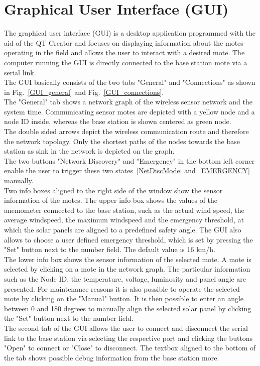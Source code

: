 \documentclass[conference]{IEEEtran}
\begin{document}
\section{Graphical User Interface (GUI)} \label{GUI}
The graphical user interface (GUI) is a desktop application programmed with the aid of the QT Creator and focuses on displaying information about the motes operating in the field and allows the user to interact with a desired mote. The computer running the GUI is directly connected to the base station mote via a serial link.\\
The GUI basically consists of the two tabs "General" and "Connections" as shown in Fig.~\ref{GUI_general} and Fig.~\ref{GUI_connections}.\\
The "General" tab shows a network graph of the wireless sensor network and the system time. Communicating sensor motes are depicted with a yellow node and a node ID inside, whereas the base station is shown centered as green node.\\
The double sided arrows depict the wireless communication route and therefore the network topology. Only the shortest paths of the nodes towards the base station as sink in the network is depicted on the graph.\\
The two buttons "Network Discovery" and "Emergency" in the bottom left corner enable the user to trigger these two states~\ref{NetDiscMode} and~\ref{EMERGENCY} manually.\\
Two info boxes aligned to the right side of the window show the sensor information of the motes. The upper info box shows the values of the anemometer connected to the base station, such as the actual wind speed, the average windspeed, the maximum windspeed and the emergency threshold, at which the solar panels are aligned to a predefined safety angle. The GUI also allows to choose a user defined emergency threshold, which is set by pressing the "Set" button next to the number field. The default value is 16 km/h.\\
The lower info box shows the sensor information of the selected mote. A mote is selected by clicking on a mote in the network graph. The particular information such as the Node ID, the temperature, voltage, luminosity and panel angle are presented. For maintenance reasons it is also possible to operate the selected mote by clicking on the "Manual" button. It is then possible to enter an angle between 0 and 180 degrees to manually align the selected solar panel by clicking the "Set" button next to the number field.\\
The second tab of the GUI allows the user to connect and disconnect the serial link to the base station via selecting the respective port and clicking the buttons "Open" to connect or "Close" to disconnect. The textbox aligned to the bottom of the tab shows possible debug information from the base station more.
\end{document}
